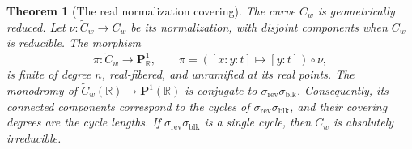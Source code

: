 \documentclass[12pt,reqno]{amsart}
\newtheorem{theorem}{Theorem}[section]
\theoremstyle{definition}
\theoremstyle{remark}
\newcommand{\R}{\mathbb R}
\begin{document}
\begin{theorem}[The real normalization covering]
\label{thm:real-monodromy}
The curve \(C_w\) is geometrically reduced.  Let
\(\nu:\widetilde C_w\to C_w\) be its normalization, with disjoint
components when \(C_w\) is reducible.  The morphism
\begin{equation}\label{eq:normalized-real-projection}
 \pi:\widetilde C_w\longrightarrow\mathbf P^1_{\R},
 \qquad \pi=([x:y:t]\mapsto[y:t])\circ\nu,
\end{equation}
is finite of degree \(n\), real-fibered, and unramified at its real
points.  The monodromy of
\(\widetilde C_w(\R)\to\mathbf P^1(\R)\) is conjugate to \(\sigma_{\mathrm{rev}}\sigma_{\mathrm{blk}}\).
Consequently, its connected components correspond to the cycles of
\(\sigma_{\mathrm{rev}}\sigma_{\mathrm{blk}}\), and their covering degrees are the cycle lengths.
If \(\sigma_{\mathrm{rev}}\sigma_{\mathrm{blk}}\) is a single cycle, then \(C_w\) is absolutely
irreducible.
\end{theorem}
\end{document}
